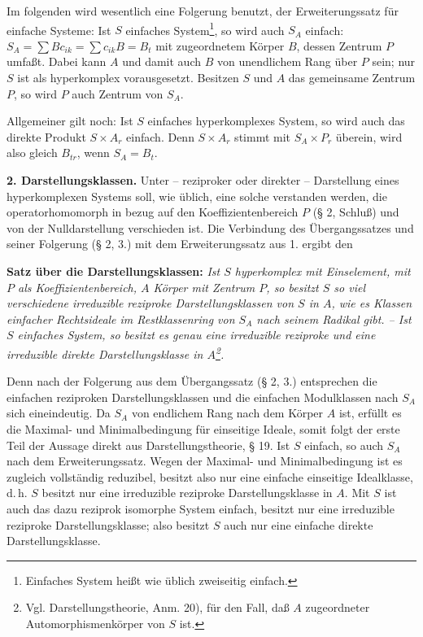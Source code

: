 Im folgenden wird wesentlich eine Folgerung benutzt, der Erweiterungssatz für einfache Systeme: Ist \(S\) einfaches System\footnote{Einfaches System heißt wie üblich \glqq{}zweiseitig einfach\grqq{}.}, so wird auch \(S_A\) einfach: \(S_A=\sum B c_{ik}=\sum c_{ik}B=B_t\) mit zugeordnetem Körper \(B\), dessen Zentrum \(P\) umfaßt. Dabei kann \(A\) und damit auch \(B\) von unendlichem Rang über \(P\) sein; nur \(S\) ist als hyperkomplex vorausgesetzt. Besitzen \(S\) und \(A\) das gemeinsame Zentrum \(P\), so wird \(P\) auch Zentrum von \(S_A\).

Allgemeiner gilt noch: Ist \(S\) einfaches hyperkomplexes System, so wird auch das direkte Produkt \(S\times A_r\) einfach. Denn \(S\times A_r\) stimmt mit \(S_A\times P_r\) überein, wird also gleich \(B_{tr}\), wenn \(S_A=B_t\).

\noindent\textbf{2. Darstellungsklassen.} Unter -- reziproker oder direkter -- Darstellung eines hyperkomplexen Systems soll, wie üblich, eine solche verstanden werden, die operatorhomomorph in bezug auf den Koeffizientenbereich \(P\) (§ 2, Schluß) und von der Nulldarstellung verschieden ist. Die Verbindung des Übergangssatzes und seiner Folgerung (§ 2, 3.) mit dem Erweiterungssatz aus 1. ergibt den

\noindent\textbf{Satz über die Darstellungsklassen:} \emph{Ist \(S\) hyperkomplex mit Einselement, mit \(P\) als Koeffizientenbereich, \(A\) Körper mit Zentrum \(P\), so besitzt \(S\) so viel verschiedene irreduzible reziproke Darstellungsklassen von \(S\) in \(A\), wie es Klassen einfacher Rechtsideale im Restklassenring von \(S_A\) nach seinem Radikal gibt. -- Ist \(S\) einfaches System, so besitzt es genau eine irreduzible reziproke und eine irreduzible direkte Darstellungsklasse in \(A\)\footnote{\normalfont Vgl. Darstellungstheorie, Anm. 20), für den Fall, daß \(A\) zugeordneter Automorphismenkörper von \(S\) ist.}.}

Denn nach der Folgerung aus dem Übergangssatz (§ 2, 3.) entsprechen die einfachen reziproken Darstellungsklassen und die einfachen Modulklassen nach \(S_A\) sich eineindeutig. Da \(S_A\) von endlichem Rang nach dem Körper \(A\) ist, erfüllt es die Maximal- und Minimalbedingung für einseitige Ideale, somit folgt der erste Teil der Aussage direkt aus Darstellungstheorie, § 19. Ist \(S\) einfach, so auch \(S_A\) nach dem Erweiterungssatz. Wegen der Maximal- und Minimalbedingung ist es zugleich vollständig reduzibel, besitzt also nur eine einfache einseitige Idealklasse, d.\,h. \(S\) besitzt nur eine irreduzible reziproke Darstellungsklasse in \(A\). Mit \(S\) ist auch das dazu reziprok isomorphe System einfach, besitzt nur eine irreduzible reziproke Darstellungsklasse; also besitzt \(S\) auch nur eine einfache direkte Darstellungsklasse.

